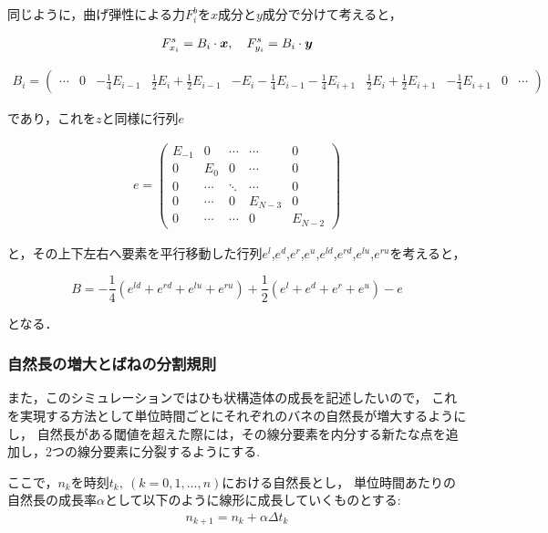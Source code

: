 同じように，曲げ弾性による力$F_{i}^{b}$を$x$成分と$y$成分で分けて考えると，

\begin{eqnarray*}
  F_{x_{i}}^{s} = B_{i} \cdot \mbox{\boldmath \(x\)}, \quad F_{y_{i}}^{s} = B_{i} \cdot \mbox{\boldmath \(y\)}
\end{eqnarray*}

\begin{eqnarray*}
  B_{i} = \left(
    \begin{array}{ccccccccc}
      \cdots & 0 & -\frac{1}{4}E_{i-1} & \frac{1}{2}E_{i} + \frac{1}{2}E_{i-1} & -E_{i} - \frac{1}{4}E_{i-1}-\frac{1}{4}E_{i+1} & \frac{1}{2}E_{i} + \frac{1}{2}E_{i+1}& -\frac{1}{4}E_{i+1} & 0 & \cdots
    \end{array}
    \right)
\end{eqnarray*}

であり，これを$z$と同様に行列$e$

\begin{eqnarray*}
  e = \left(
    \begin{array}{ccccc}
      E_{-1} & 0      & \cdots & \cdots  & 0       \\
      0      & E_{0}  & 0      & \cdots  & 0       \\
      0      & \cdots & \ddots & \cdots  & 0       \\
      0      & \cdots & 0      & E_{N-3} & 0       \\
      0      & \cdots & \cdots & 0       & E_{N-2}
    \end{array}
  \right)
\end{eqnarray*}

と，その上下左右へ要素を平行移動した行列$e^{l}$,$e^{d}$,$e^{r}$,$e^{u}$,$e^{ld}$,$e^{rd}$,$e^{lu}$,$e^{ru}$を考えると，

$$B = -\frac{1}{4}\left(e^{ld} + e^{rd} + e^{lu} + e^{ru}\right) + \frac{1}{2}\left( e^{l} + e^{d} + e^{r} + e^{u} \right) - e$$

となる．

\subsubsection{自然長の増大とばねの分割規則}

また，このシミュレーションではひも状構造体の成長を記述したいので，
これを実現する方法として単位時間ごとにそれぞれのバネの自然長が増大するようにし，
自然長がある閾値を超えた際には，その線分要素を内分する新たな点を追加し，2つの線分要素に分裂するようにする.

ここで，$n_{k}$を時刻$t_{k},\ (k = 0, 1, \dots ,n)$における自然長とし，
単位時間あたりの自然長の成長率$\alpha$として以下のように線形に成長していくものとする:
\begin{eqnarray*}
  n_{k + 1} = n_{k} + \alpha \Delta t_{k}
\end{eqnarray*}

